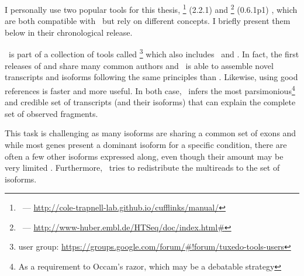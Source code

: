 I personally use two popular tools for this thesis,
\cuffl\footnote{\cuffl\ ---
\href{http://cole-trapnell-lab.github.io/cufflinks/manual/}%
{http://cole-trapnell-lab.github.io/cufflinks/manual/}} (2.2.1)
 and
\htseq\footnote{\htseq\ ---
\href{http://www-huber.embl.de/HTSeq/doc/index.html\#}%
{http://www-huber.embl.de/HTSeq/doc/index.html\#}} (0.6.1p1)
,
which are both compatible with \toph\ but rely on different concepts.
I briefly present them below in their chronological release.

\cuffl\ is part of a collection of tools called
\footnote{ user group:
\href{https://groups.google.com/forum/\#!forum/tuxedo-tools-users}%
{https://groups.google.com/forum/\#!forum/tuxedo-tools-users}} which also includes
\toph\ and . In fact, the first releases of  and
 share many common authors and \cuffl\ is able to assemble
 novel transcripts and isoforms following the same principles
than \toph. Likewise, using good references is faster and more useful.
In both case, \cuffl\ infers the most parsimonious\footnote{As a requirement to
Occam's razor, which may be a debatable strategy }
and credible set of transcripts (and their isoforms) that can explain the
complete set of observed fragments.

This task is challenging as many isoforms are sharing a common set of exons and
while most genes present a dominant isoform for a specific condition,
there are often a few other isoforms expressed along, even though their amount
may be very limited . Furthermore, \cuffl\ tries to
redistribute the multireads to the set of isoforms.


